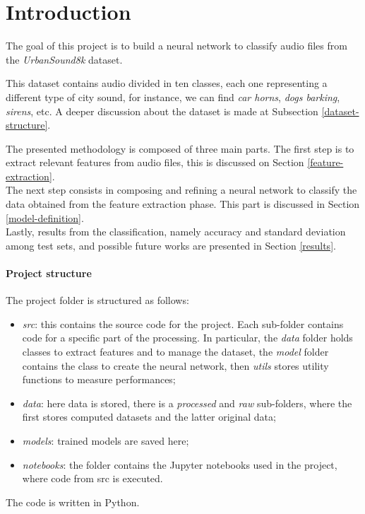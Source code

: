 \section{Introduction}

The goal of this project is to build a neural network to classify audio 
files from the \emph{UrbanSound8k} dataset.~\cite{dataset}

This dataset contains audio divided in ten classes, each one representing 
a different type of city sound, for instance, we can find \emph{car horns}, 
\emph{dogs barking}, \emph{sirens}, etc. A deeper discussion about 
the dataset is made at Subsection \vref*{dataset-structure}.

The presented methodology is composed of three main parts.
The first step is to extract relevant features from audio files, 
this is discussed on Section \vref*{feature-extraction}.\\
The next step consists in composing and refining a neural network 
to classify the data obtained from the feature extraction phase. This part is
discussed in Section \vref*{model-definition}.\\
Lastly, results from the classification, namely accuracy 
and standard deviation among test sets, and possible future works 
are presented in Section \vref*{results}.

\paragraph{Project structure}

The project folder is structured as follows:
\begin{itemize}
    \item \emph{src}: this contains the source code for the
    project. Each sub-folder contains code for a specific part of the 
    processing. In particular, the \emph{data} folder holds classes to 
    extract features and to manage the dataset, the \emph{model} folder
    contains the class to create the neural network, then \emph{utils} 
    stores utility functions to measure performances;
    \item \emph{data}: here data is stored, there is a \emph{processed}
    and \emph{raw} sub-folders, where the first stores computed datasets 
    and the latter original data;
    \item \emph{models}: trained models are saved here;
    \item \emph{notebooks}: the folder contains the Jupyter notebooks 
    used in the project, where code from src is executed.
\end{itemize}
The code is written in Python.
\newpage